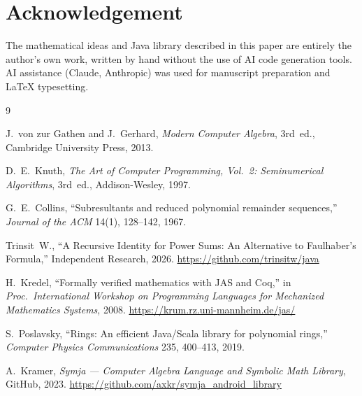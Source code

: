 \documentclass[11pt,a4paper]{article}
\begin{document}
\section*{Acknowledgement}

The mathematical ideas and Java library described in this paper are entirely the
author's own work, written by hand without the use of AI code generation tools.
AI assistance (Claude, Anthropic) was used for manuscript preparation and
\LaTeX{} typesetting.

\begin{thebibliography}{9}

J.~von zur Gathen and J.~Gerhard,
\textit{Modern Computer Algebra}, 3rd~ed.,
Cambridge University Press, 2013.

D.~E.~Knuth,
\textit{The Art of Computer Programming, Vol.~2: Seminumerical Algorithms},
3rd~ed., Addison-Wesley, 1997.

G.~E.~Collins,
``Subresultants and reduced polynomial remainder sequences,''
\textit{Journal of the ACM} 14(1), 128--142, 1967.

Trinsit~W.,
``A Recursive Identity for Power Sums: An Alternative to Faulhaber's
Formula,'' Independent Research, 2026.
\url{https://github.com/trinsitw/java}

H.~Kredel,
``Formally verified mathematics with JAS and Coq,''
in \textit{Proc.\ International Workshop on Programming Languages for
Mechanized Mathematics Systems}, 2008.
\url{https://krum.rz.uni-mannheim.de/jas/}

S.~Poslavsky,
``Rings: An efficient Java/Scala library for polynomial rings,''
\textit{Computer Physics Communications} 235, 400--413, 2019.

A.~Kramer,
\textit{Symja --- Computer Algebra Language and Symbolic Math Library},
GitHub, 2023.
\url{https://github.com/axkr/symja_android_library}

\end{thebibliography}
\end{document}
